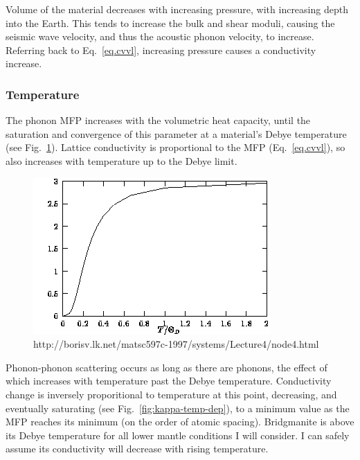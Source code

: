 Volume of the material decreases with increasing pressure, with increasing depth into the Earth. This tends to increase the bulk and shear moduli, causing the seismic wave velocity, and thus the acoustic phonon velocity, to increase. Referring back to Eq.~\ref{eq.cvvl}, increasing pressure causes a conductivity increase.

\subsubsection{Temperature}

The phonon MFP increases with the volumetric heat capacity, until the saturation and convergence of this parameter at a material's Debye temperature (see Fig.~\ref{fig:debye-model}). Lattice conductivity is proportional to the MFP (Eq.~\ref{eq.cvvl}), so also increases with temperature up to the Debye limit. 

\begin{figure}[h!]
  \includegraphics[width=\linewidth]{Figures/debye-model.png}
  \caption[DEBYE MODEL]{http://borisv.lk.net/matsc597c-1997/systems/Lecture4/node4.html}
  \label{fig:debye-model}
\end{figure}

Phonon-phonon scattering occurs as long as there are phonons, the effect of which increases with temperature past the Debye temperature. Conductivity change is inversely proporitional to temperature at this point, decreasing, and eventually saturating (see Fig.~\ref{fig:kappa-temp-dep}), to a minimum value as the MFP reaches its minimum (on the order of atomic spacing). Bridgmanite is above its Debye temperature for all lower mantle conditions I will consider. I can safely assume its conductivity will decrease with rising temperature.

